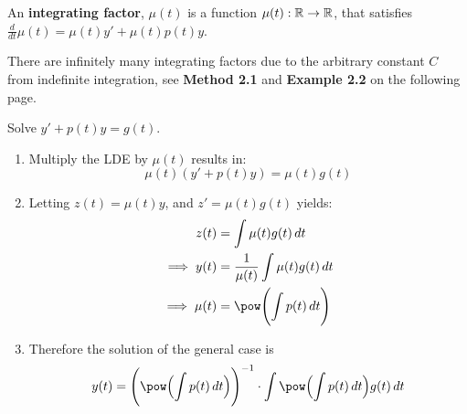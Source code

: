 \documentclass[twoside]{report}
\begin{document}
    \begin{definition}
        An \textbf{integrating factor}, $\mu(t)$ is a function $\mu(t): \mathbb{R} \to \mathbb{R}$, that satisfies $\frac{d}{dt}\mu(t) = \mu(t)y'+\mu(t)p(t)y$.
    \end{definition}
    \begin{remark}
        There are infinitely many integrating factors due to the arbitrary constant $C$ from indefinite integration, see \textbf{Method 2.1} and \textbf{Example 2.2} on the following page.
    \end{remark}\np
    \begin{method}
        Solve $y' + p(t)y = g(t)$.
        \begin{enumerate}
            \item Multiply the LDE by $\mu(t)$ results in:
                \begin{equation}
                    \mu(t)(y' + p(t)y) = \mu(t)g(t)
                \end{equation}
            \item Letting $z(t) = \mu(t)y$, and $z' = \mu(t)g(t)$ yields:
                \begin{align}
                    z(t) &= \int \mu(t)g(t)\,dt\\
                    \implies y(t) &= \frac{1}{\mu(t)}\int \mu(t)g(t)\,dt\\
                    \implies \mu(t) &= \pow\BBp{\int p(t)\,dt}
                \end{align}
            \item Therefore the solution of the general case is
                \begin{equation}
                    y(t) = \BBp{\pow\Bp{\int p(t)\,dt}}^{-1}\cdot \int \pow\Bp{\int p(t)\,dt}g(t)\,dt
                \end{equation}
        \end{enumerate}
    \end{method}
\end{document}
